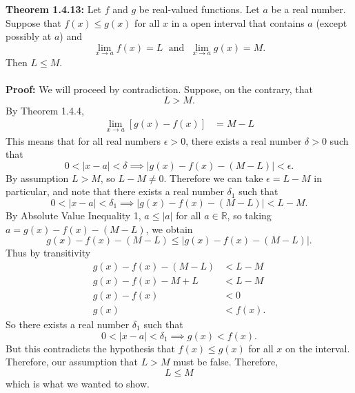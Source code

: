 \documentclass{article}
\begin{document}
	\textbf{Theorem 1.4.13:} Let $f$ and $g$ be real-valued functions. Let $a$ be a real number. Suppose that $f(x) \leq g(x)$ for all $x$ in a open interval that contains $a$ (except possibly at $a$) and
	$$\lim_{x \to a}{f(x)} = L \; \text{ and } \; \lim_{x \to a}{g(x)} = M.$$
	Then $L \leq M$. \\\\
	\textbf{Proof:}
	 We will proceed by contradiction. Suppose, on the contrary, that 
	 $$L > M.$$
	 By Theorem 1.4.4,
	 \begin{align*}
	 	\lim_{x \to a}{\left[g(x) - f(x)\right]} &= M - L
	 \end{align*}
	 This means that for all real numbers $\epsilon > 0$, there exists a real number $\delta > 0$ such that
	 $$0 < |x - a| < \delta \implies |g(x) - f(x) - (M - L)| < \epsilon.$$
	 By assumption $L > M$, so $L - M \neq 0$. Therefore we can take $\epsilon = L - M$ in particular, and note that there exists a real number $\delta_1$ such that
	 $$0 < |x - a| < \delta_1 \implies |g(x) - f(x) - (M - L)| < L - M.$$
	 By Absolute Value Inequality 1, $a \leq |a|$ for all $a \in \mathbb{R}$, so taking $a = g(x) - f(x) - (M - L)$, we obtain
	 $$g(x) - f(x) - (M - L) \leq |g(x) - f(x) - (M - L)|.$$
	 Thus by transitivity
	 \begin{align*}
	 	g(x) - f(x) - (M - L) &<  L - M \\
	 	g(x) - f(x) - M + L &< L - M \\
	 	g(x) - f(x) &< 0 \\
	 	g(x) &< f(x).
	 \end{align*}
	 So there exists a real number $\delta_1$ such that
	 $$0 < |x - a| < \delta_1 \implies g(x) < f(x).$$
	 But this contradicts the hypothesis that $f(x) \leq g(x)$ for all $x$ on the interval. Therefore, our assumption that $L > M$ must be false. Therefore,
	 $$L \leq M$$
	 which is what we wanted to show.
\end{document}
